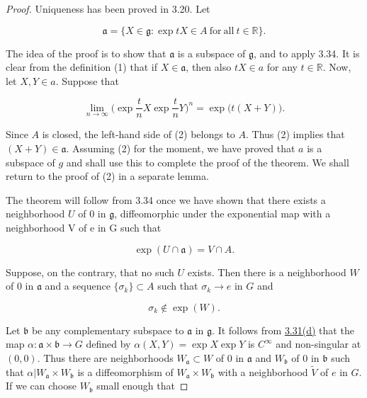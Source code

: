 \begin{proof}
Uniqueness has been proved in 3.20. Let

\begin{equation}
\tag{1}\label{eq:3.42:1}
\mathfrak{a}=\{X\in\mathfrak{g}\colon\exp tX\in A\mathrm{~for~all~}t\in\mathbb{R}\}.
\end{equation}

The idea of the proof is to show that $\mathfrak{a}$ is a subspace of $\mathfrak{g}$, and to apply 3.34. It is clear from the definition (1) that if $X\in\mathfrak{a}$, then also $tX \in a$ for any $t \in \mathbb{R}$. Now, let $X, Y \in a$. Suppose that

\begin{equation}
\tag{2}\label{eq:3.42:2}
\lim_{n\to\infty}\Big(\exp\frac{t}{n}X\exp\frac{t}{n}Y\Big)^{n}=\exp\big(t(X+Y)\big).
\end{equation}

Since $A$ is closed, the left-hand side of (2) belongs to $A$. Thus (2) implies that $(X+Y)\in\mathfrak{a}$. Assuming (2) for the moment, we have proved that $a$ is a subspace of $g$ and shall use this to complete the proof of the theorem. We shall return to the proof of (2) in a separate lemma.

The theorem will follow from 3.34 once we have shown that there exists a neighborhood $U$ of 0 in $\mathfrak{g}$, diffeomorphic under the exponential map with a neighborhood V of e in G such that

\begin{equation}
\tag{3}\label{eq:3.42:3}
\exp(U\cap\mathfrak{a})=V\cap A.
\end{equation}

Suppose, on the contrary, that no such $U$ exists. Then there is a neighborhood $W$ of 0 in $\mathfrak{a}$ and a sequence $\{\sigma_k\} \subset A$ such that $\sigma_k \to e$ in $G$ and

\begin{equation}
\tag{4}\label{eq:3.42:4}
\sigma_{k}\notin\exp(W).
\end{equation}

Let $\mathfrak{b}$ be any complementary subspace to $\mathfrak{a}$ in $\mathfrak{g}$. It follows from \hyperref[thm:3.31]{3.31(d)} that the map $\alpha\colon\mathfrak{a}\times\mathfrak{b}\to G$ defined by $\alpha(X, Y) = \exp X \exp Y$ is $C^\infty$ and non-singular at $(0,0)$. Thus there are neighborhoods $W_{\mathfrak{a}}\subset W$ of $0$ in $\mathfrak{a}$ and $W_{\mathfrak{b}}$ of $0$ in $\mathfrak{b}$ such that $\alpha\big|W_{\mathfrak{a}}\times W_{\mathfrak{b}}$ is a diffeomorphism of $W_{\mathfrak{a}}\times W_{\mathfrak{b}}$ with a neighborhood $\tilde{V}$ of $e$ in $G$. If we can choose $W_{\mathfrak{b}}$ small enough that


\end{proof}
